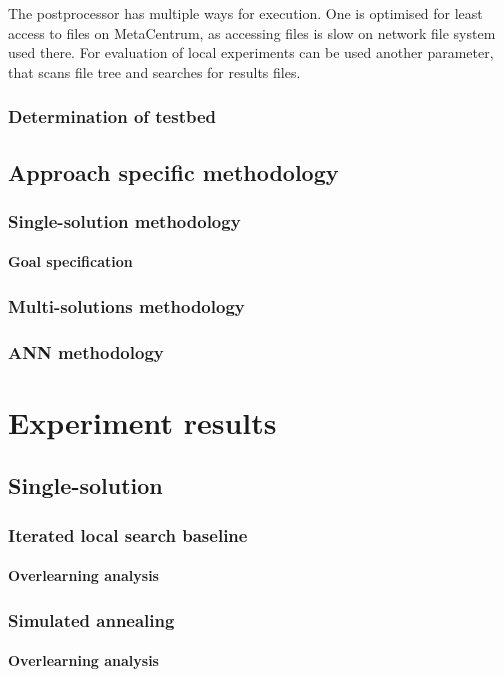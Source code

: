 \documentclass[
  print, %
  Table,   %
  nolof,     %
  nolot,     %
  draft, %
  11pt, %
  oneside  %
]{fithesis3}
\begin{document}
The postprocessor has multiple ways for execution. One is optimised for least access to files on MetaCentrum, as accessing files is slow on network file system used there. For evaluation of local experiments can be used another parameter, that scans file tree and searches for results files.

\subsection{Determination of testbed}
\section{Approach specific methodology}
\subsection{Single-solution methodology}
\subsubsection{Goal specification}
\subsection{Multi-solutions methodology}
\subsection{ANN methodology}

\chapter{Experiment results}

\section{Single-solution}
\subsection{Iterated local search baseline}
\subsubsection{Overlearning analysis}
\subsection{Simulated annealing}
\subsubsection{Overlearning analysis}
\end{document}
